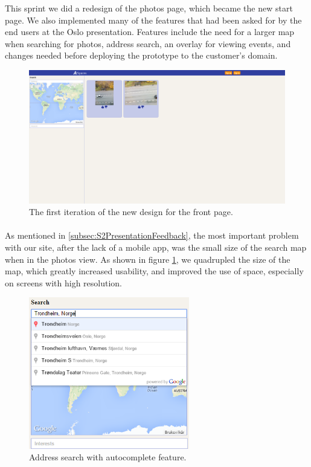 This sprint we did a redesign of the photos page, which became the new start page. We also implemented many of the features that had been asked for by the end users at the Oslo presentation. Features include the need for a larger map when searching for photos, address search, an overlay for viewing events, and changes needed before deploying the prototype to the customer's domain.

\begin{figure}[ht!]
  \centering
  \includegraphics[width=\linewidth]{./img/webpage/27Oct/Frontpage27Oct}
  \caption{The first iteration of the new design for the front page.}
  \label{fig:S5DesignImplFront27Oct}
\end{figure}

\paragraph{} As mentioned in \ref{subsec:S2PresentationFeedback}, the most important problem with our site, after the lack of a mobile app, was the small size of the search map when in the photos view. As shown in figure \ref{fig:S5DesignImplFront27Oct}, we quadrupled the size of the map, which greatly increased usability, and improved the use of space, especially on screens with high resolution.

\begin{figure}[ht!]
  \centering
  \includegraphics[width=70mm]{./img/webpage/27Oct/AddressAutocomplete.png}
  \caption{Address search with autocomplete feature.}
  \label{fig:S5DesignImplAddressAuto}
\end{figure}

